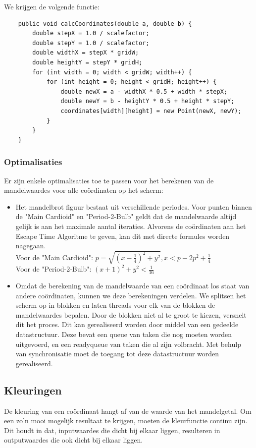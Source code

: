 \documentclass[hidelinks, dutch]{article}
\begin{document}
We krijgen de volgende functie:
\begin{lstlisting}
    public void calcCoordinates(double a, double b) {
	    double stepX = 1.0 / scalefactor;
	    double stepY = 1.0 / scalefactor;
	    double widthX = stepX * gridW;
	    double heightY = stepY * gridH;
        for (int width = 0; width < gridW; width++) {
		    for (int height = 0; height < gridH; height++) {
			    double newX = a - widthX * 0.5 + width * stepX;
			    double newY = b - heightY * 0.5 + height * stepY;
			    coordinates[width][height] = new Point(newX, newY);
		    }
	    }
    }
\end{lstlisting}
\subsubsection{Optimalisaties}
Er zijn enkele optimalisaties toe te passen voor het berekenen van de mandelwaardes voor alle coördinaten op het scherm:
\begin{itemize}
	\item Het mandelbrot figuur bestaat uit verschillende periodes. Voor punten binnen de "Main Cardioid" en "Period-2-Bulb" geldt dat de mandelwaarde altijd gelijk is aan het maximale aantal iteraties. Alvorens de coördinaten aan het Escape Time Algoritme te geven, kan dit met directe formules worden nagegaan. \\ Voor de "Main Cardioid": $p=\sqrt{(x-\frac{1}{4})^2+y^2}, x<p-2p^2+\frac{1}{4}$ \\
	Voor de "Period-2-Bulb": $(x+1)^2+y^2<\frac{1}{16}$
	
	\item Omdat de berekening van de mandelwaarde van een coördinaat los staat van andere coördinaten, kunnen we deze berekeningen verdelen. We splitsen het scherm op in blokken en laten threads voor elk van de blokken de mandelwaardes bepalen. Door de blokken niet al te groot te kiezen, versnelt dit het proces. Dit kan gerealiseerd worden door middel van een gedeelde datastructuur. Deze bevat een queue van taken die nog moeten worden uitgevoerd, en een readyqueue van taken die al zijn volbracht. Met behulp van synchronisatie moet de toegang tot deze datastructuur worden gerealiseerd. 
\end{itemize}

\subsection{Kleuringen}
De kleuring van een coördinaat hangt af van de waarde van het mandelgetal. Om een zo'n mooi mogelijk resultaat te krijgen, moeten de kleurfunctie continu zijn. Dit houdt in dat, inputwaardes die dicht bij elkaar liggen, resulteren in outputwaardes die ook dicht bij elkaar liggen. 
\end{document}
